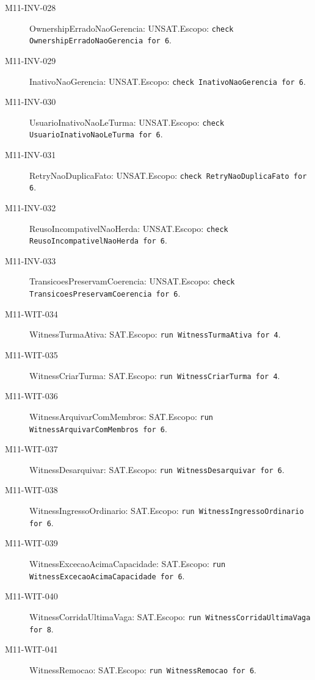 \begin{description}
\item[M11-INV-028] OwnershipErradoNaoGerencia: UNSAT.\newline Escopo: \texttt{check OwnershipErradoNaoGerencia for 6}.
\item[M11-INV-029] InativoNaoGerencia: UNSAT.\newline Escopo: \texttt{check InativoNaoGerencia for 6}.
\item[M11-INV-030] UsuarioInativoNaoLeTurma: UNSAT.\newline Escopo: \texttt{check UsuarioInativoNaoLeTurma for 6}.
\item[M11-INV-031] RetryNaoDuplicaFato: UNSAT.\newline Escopo: \texttt{check RetryNaoDuplicaFato for 6}.
\item[M11-INV-032] ReusoIncompativelNaoHerda: UNSAT.\newline Escopo: \texttt{check ReusoIncompativelNaoHerda for 6}.
\item[M11-INV-033] TransicoesPreservamCoerencia: UNSAT.\newline Escopo: \texttt{check TransicoesPreservamCoerencia for 6}.
\item[M11-WIT-034] WitnessTurmaAtiva: SAT.\newline Escopo: \texttt{run WitnessTurmaAtiva for 4}.
\item[M11-WIT-035] WitnessCriarTurma: SAT.\newline Escopo: \texttt{run WitnessCriarTurma for 4}.
\item[M11-WIT-036] WitnessArquivarComMembros: SAT.\newline Escopo: \texttt{run WitnessArquivarComMembros for 6}.
\item[M11-WIT-037] WitnessDesarquivar: SAT.\newline Escopo: \texttt{run WitnessDesarquivar for 6}.
\item[M11-WIT-038] WitnessIngressoOrdinario: SAT.\newline Escopo: \texttt{run WitnessIngressoOrdinario for 6}.
\item[M11-WIT-039] WitnessExcecaoAcimaCapacidade: SAT.\newline Escopo: \texttt{run WitnessExcecaoAcimaCapacidade for 6}.
\item[M11-WIT-040] WitnessCorridaUltimaVaga: SAT.\newline Escopo: \texttt{run WitnessCorridaUltimaVaga for 8}.
\item[M11-WIT-041] WitnessRemocao: SAT.\newline Escopo: \texttt{run WitnessRemocao for 6}.

\end{description}
